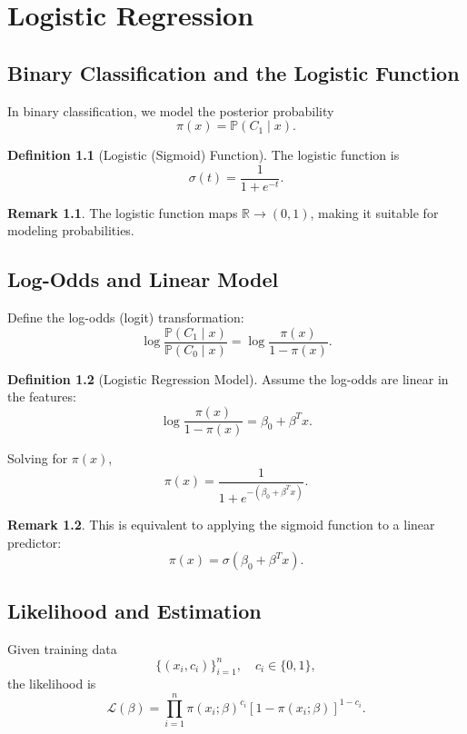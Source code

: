 \documentclass[12pt,oneside]{book}
\numberwithin{equation}{section}
\theoremstyle{definition}
\newtheorem{definition}{Definition}[section]
\newtheorem{remark}{Remark}[section]
\theoremstyle{plain}
\theoremstyle{remark}
\newcommand{\R}{\mathbb{R}}
\newcommand{\Prob}{\mathbb{P}}
\begin{document}
\chapter{Logistic Regression}

\section{Binary Classification and the Logistic Function}

In binary classification, we model the posterior probability
\[
\pi(x) = \Prob(C_1 \mid x).
\]

\begin{definition}[Logistic (Sigmoid) Function]
The logistic function is
\[
\sigma(t)
=
\frac{1}{1+e^{-t}}.
\]
\end{definition}

\begin{remark}
The logistic function maps $\R \to (0,1)$, making it suitable for modeling probabilities.
\end{remark}

\section{Log-Odds and Linear Model}

Define the log-odds (logit) transformation:
\[
\log \frac{\Prob(C_1 \mid x)}{\Prob(C_0 \mid x)}
=
\log \frac{\pi(x)}{1-\pi(x)}.
\]

\begin{definition}[Logistic Regression Model]
Assume the log-odds are linear in the features:
\[
\log \frac{\pi(x)}{1-\pi(x)}
=
\beta_0 + \beta^T x.
\]
\end{definition}

Solving for $\pi(x)$,
\[
\pi(x)
=
\frac{1}{1+e^{-(\beta_0+\beta^T x)}}.
\]

\begin{remark}
This is equivalent to applying the sigmoid function to a linear predictor:
\[
\pi(x) = \sigma(\beta_0+\beta^T x).
\]
\end{remark}

\section{Likelihood and Estimation}

Given training data
\[
\{(x_i,c_i)\}_{i=1}^n,
\quad
c_i \in \{0,1\},
\]
the likelihood is
\[
\mathcal{L}(\beta)
=
\prod_{i=1}^n
\pi(x_i;\beta)^{c_i}
\left[1-\pi(x_i;\beta)\right]^{1-c_i}.
\]
\end{document}
